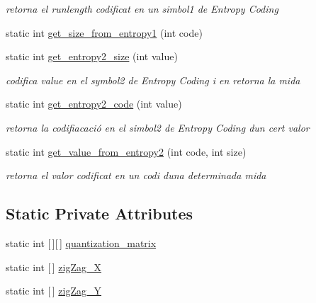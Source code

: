 \begin{DoxyCompactItemize}
\begin{DoxyCompactList}\small\item\em retorna el runlength codificat en un simbol1 de Entropy Coding \end{DoxyCompactList}\item 
static int \hyperlink{classdomini_1_1algorithm_1_1JPEG_a8d1005fb7833d36a064afb1c5e15bbd3}{get\+\_\+size\+\_\+from\+\_\+entropy1} (int code)
\item 
static int \hyperlink{classdomini_1_1algorithm_1_1JPEG_aa9bc9bee7181efee254be843e23ee2c6}{get\+\_\+entropy2\+\_\+size} (int value)
\begin{DoxyCompactList}\small\item\em codifica value en el symbol2 de Entropy Coding i en retorna la mida \end{DoxyCompactList}\item 
static int \hyperlink{classdomini_1_1algorithm_1_1JPEG_a0ccbcda5311dc96a30e5cb7f2a5b95b5}{get\+\_\+entropy2\+\_\+code} (int value)
\begin{DoxyCompactList}\small\item\em retorna la codifiacació en el simbol2 de Entropy Coding d\textquotesingle{}un cert valor \end{DoxyCompactList}\item 
static int \hyperlink{classdomini_1_1algorithm_1_1JPEG_a41c69fe2e29999dd17a555859df22530}{get\+\_\+value\+\_\+from\+\_\+entropy2} (int code, int size)
\begin{DoxyCompactList}\small\item\em retorna el valor codificat en un codi d\textquotesingle{}una determinada mida \end{DoxyCompactList}\end{DoxyCompactItemize}
\subsection*{Static Private Attributes}
\begin{DoxyCompactItemize}
\item 
static int \mbox{[}$\,$\mbox{]}\mbox{[}$\,$\mbox{]} \hyperlink{classdomini_1_1algorithm_1_1JPEG_a7c95eb140dbe185a31b402d48ec17a66}{quantization\+\_\+matrix}
\item 
static int \mbox{[}$\,$\mbox{]} \hyperlink{classdomini_1_1algorithm_1_1JPEG_a7d3829cbffd758c087341a8da13dd2ca}{zig\+Zag\+\_\+X}
\item 
static int \mbox{[}$\,$\mbox{]} \hyperlink{classdomini_1_1algorithm_1_1JPEG_ad886d8aa00a40cb151b446534f0d1bcc}{zig\+Zag\+\_\+Y}
\end{DoxyCompactItemize}


